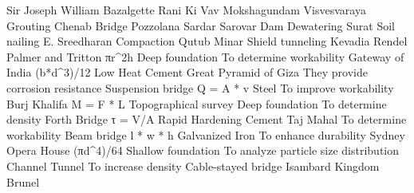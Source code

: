 \answerkey
{} Sir Joseph William Bazalgette
 Rani Ki Vav
 Mokshagundam Visvesvaraya
 Grouting
 Chenab Bridge
 Pozzolana
 Sardar Sarovar Dam
 Dewatering
 Surat
 Soil nailing
 E. Sreedharan
 Compaction
 Qutub Minar
 Shield tunneling
 Kevadia
 Rendel Palmer and Tritton
 πr^2h
 Deep foundation
 To determine workability
 Gateway of India
 (b*d^3)/12
 Low Heat Cement
 Great Pyramid of Giza
 They provide corrosion resistance
 Suspension bridge
 Q = A * v
 Steel
 To improve workability
 Burj Khalifa
 M = F * L
 Topographical survey
 Deep foundation
 To determine density
 Forth Bridge
 τ = V/A
 Rapid Hardening Cement
 Taj Mahal
 To determine workability
 Beam bridge
 l * w * h
 Galvanized Iron
 To enhance durability
 Sydney Opera House
 (πd^4)/64
 Shallow foundation
 To analyze particle size distribution
 Channel Tunnel
 To increase density
 Cable-stayed bridge
 Isambard Kingdom Brunel
\endanswerkey